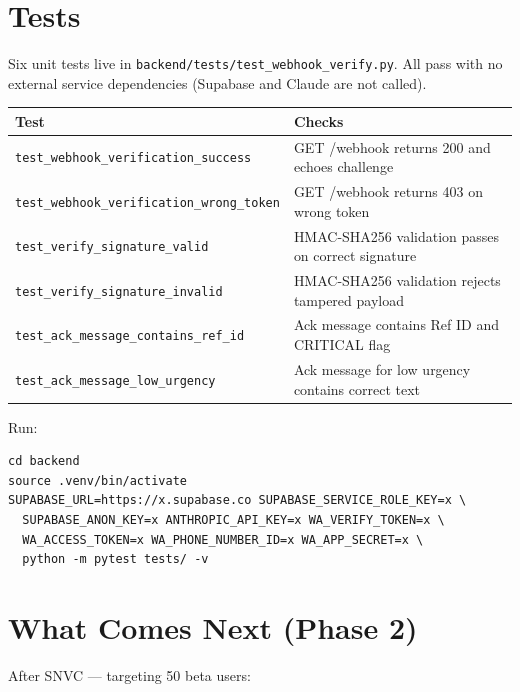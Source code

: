 \documentclass[11pt, a4paper]{article}
\begin{document}
\newpage

\section{Tests}

Six unit tests live in \texttt{backend/tests/test\_webhook\_verify.py}. All pass with no external service dependencies (Supabase and Claude are not called).

\renewcommand{\arraystretch}{1.3}
\begin{tabularx}{\linewidth}{lX}
\toprule
\textbf{Test} & \textbf{Checks} \\
\midrule
\texttt{test\_webhook\_verification\_success}  & GET /webhook returns 200 and echoes challenge \\
\texttt{test\_webhook\_verification\_wrong\_token} & GET /webhook returns 403 on wrong token \\
\texttt{test\_verify\_signature\_valid}       & HMAC-SHA256 validation passes on correct signature \\
\texttt{test\_verify\_signature\_invalid}     & HMAC-SHA256 validation rejects tampered payload \\
\texttt{test\_ack\_message\_contains\_ref\_id} & Ack message contains Ref ID and CRITICAL flag \\
\texttt{test\_ack\_message\_low\_urgency}     & Ack message for low urgency contains correct text \\
\bottomrule
\end{tabularx}

Run:
\begin{lstlisting}[style=bash]
cd backend
source .venv/bin/activate
SUPABASE_URL=https://x.supabase.co SUPABASE_SERVICE_ROLE_KEY=x \
  SUPABASE_ANON_KEY=x ANTHROPIC_API_KEY=x WA_VERIFY_TOKEN=x \
  WA_ACCESS_TOKEN=x WA_PHONE_NUMBER_ID=x WA_APP_SECRET=x \
  python -m pytest tests/ -v
\end{lstlisting}

\newpage

\section{What Comes Next (Phase 2)}

After SNVC — targeting 50 beta users:
\end{document}
